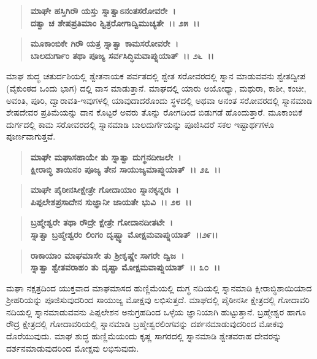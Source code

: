 \begin{verse}
\textbf{ಮಾಘೇ ಹಸ್ತಿಗಿ‌ರೌ ಯಸ್ತು ಸ್ನಾತ್ವಾಽನಂತಸರೋವರೇ~।}\\\textbf{ದತ್ವಾ ಚ ಶೇಷಪ್ರತಿಮಾಂ ಶ್ವಿತ್ರರೋಗಾದ್ವಿಮುಚ್ಯತೇ~।। ೨೫~।।}
\end{verse}

\begin{verse}
\textbf{ಮೂಕಾಂಬಿಕೇ ಗಿರೌ‌ ಯತ್ರ ಸ್ನಾತ್ವಾ ಕಾಮಸರೋವರೇ~।}\\\textbf{ಬಾಲದುರ್ಗಾಂ ತಥಾ ಪೂಜ್ಯ ಸರ್ವಸಿದ್ಧಿಮವಾಪ್ನುಯಾತ್~।। ೨೬~।।}
\end{verse}

ಮಾಘ ಶುದ್ಧ ಚತುರ್ದಶಿಯಲ್ಲಿ ಶ್ವೇತನಾಯಕ ಪರ್ವತದಲ್ಲಿ ಶ್ವೇತ ಸರೋವರದಲ್ಲಿ ಸ್ನಾನ ಮಾಡುವವನು ಶ್ವೇತದ್ವೀಪ (ವೈಕುಂಠದ ಒಂದು ಭಾಗ) ದಲ್ಲಿ ವಾಸ ಮಾಡುತ್ತಾನೆ. ಮಾಘದಲ್ಲಿ ಯಾರು ಅಯೋಧ್ಯಾ, ಮಥುರಾ, ಕಾಶೀ, ಕಂಚೀ, ಅವಂತಿ, ಪೂರಿ, ದ್ವಾರಾವತಿ-ಇವುಗಳಲ್ಲಿ ಯಾವುದಾದರೊಂದು ಸ್ಥಳದಲ್ಲಿ ಅಥವಾ ಅನಂತ ಸರೋವರದಲ್ಲಿ ಸ್ನಾನಮಾಡಿ ಶೇಷದೇವರ ಪ್ರತಿಮೆಯನ್ನು ದಾನ ಕೊಟ್ಟರೆ ಅವರು ತೊನ್ನು ರೋಗದಿಂದ ಬಿಡುಗಡೆ ಹೊಂದುತ್ತಾರೆ. ಮೂಕಾಂಬಿಕೆ ದುರ್ಗದಲ್ಲಿ ಕಾಮ ಸರೋವರದಲ್ಲಿ ಸ್ನಾನಮಾಡಿ ಬಾಲದುರ್ಗೆಯನ್ನು ಪೂಜಿಸಿದರೆ ಸಕಲ ಇಷ್ಟಾರ್ಥಗಳೂ ಪೂರ್ಣವಾಗುತ್ತವೆ.

\begin{verse}
\textbf{ಮಾಘೇ ಮಘಾಸಹಾಯೇ ತು ಸ್ನಾತ್ವಾ ದುಗ್ಧನದೀಜಲೇ~।}\\\textbf{ಕ್ಷೀರಾಬ್ಧಿ ಶಾಯಿನಂ ಪೂಜ್ಯ ತೇನ ಸಾಯುಜ್ಯಮಾಪ್ನುಯಾತ್~।। ೨೭~।।}
\end{verse}

\begin{verse}
\textbf{ಮಾಘೇ ಪೈಠೀನಸೀಕ್ಷೇತ್ರೇ ಗೋದಾಯಾಂ ಸ್ನಾನಕೃನ್ನರಃ~।}\\\textbf{ಪಿಪ್ಪಲೇಶಪ್ರಸಾದೇನ ಸುಜ್ಞಾನೀ ಜಾಯತೇ ಭುವಿ~।। ೨೮~।। }
\end{verse}

\begin{verse}
\textbf{ಬ್ರಹ್ಮೇಶ್ವರೇ ತಥಾ ರೌದ್ರೇ ಕ್ಷೇತ್ರೇ ಗೋದಾನದೀತಟೇ~।}\\\textbf{ಸ್ನಾತ್ವಾ ಬ್ರಹ್ಮೇಶ್ವರಂ ಲಿಂಗಂ ದೃಷ್ಟ್ವಾ ಮೋಕ್ಷಮವಾಪ್ನುಯಾತ್~।।೨೯।।} 
\end{verse}

\begin{verse}
\textbf{ರಾಕಾಯಾಂ ಮಾಘಮಾಸೇ ತು ಶ‍್ರೀಕೃಷ್ಣೇ ಸಾಗರೇ ದ್ವಿಜ~।}\\\textbf{ಸ್ನಾತ್ವಾ ಶ್ವೇತವರಾಹಂ ತು ದೃಷ್ಟಾ ಮೋಕ್ಷಮವಾಪ್ನುಯಾತ್~।। ೩೦~।।}
\end{verse}

ಮಘಾ ನಕ್ಷತ್ರದಿಂದ ಯುಕ್ತವಾದ ಮಾಘಮಾಸದ ಹುಣ್ಣಿಮೆಯಲ್ಲಿ ದುಗ್ಧ ನದಿಯಲ್ಲಿ ಸ್ನಾನಮಾಡಿ ಕ್ಷೀರಾಬ್ಧಿಶಾಯಿಯಾದ ಶ‍್ರೀಹರಿಯನ್ನು ಪೂಜಿಸುವುದರಿಂದ ಸಾಯುಜ್ಯ ಮೋಕ್ಷವು ಲಭಿಸುತ್ತದೆ. ಮಾಘದಲ್ಲಿ ಪೈಠೀನಸೀ ಕ್ಷೇತ್ರದಲ್ಲಿ ಗೋದಾವರಿ ನದಿಯಲ್ಲಿ ಸ್ನಾನಮಾಡುವವನು ಪಿಪ್ಪಲೇಶನ ಅನುಗ್ರಹದಿಂದ ಒಳ್ಳೆಯ ಜ್ಞಾನಿಯಾಗಿ ಹುಟ್ಟುತ್ತಾನೆ. ಬ್ರಹ್ಮೇಶ್ವರ ಹಾಗೂ ರೌದ್ರ ಕ್ಷೇತ್ರದಲ್ಲಿ ಗೋದಾವರಿಯಲ್ಲಿ ಸ್ನಾನಮಾಡಿ ಬ್ರಹ್ಮೇಶ್ವರಲಿಂಗವನ್ನು ದರ್ಶನಮಾಡುವುದರಿಂದ ಮೋಕವು ದೊರೆಯುವುದು. ಮಾಘ ಶುದ್ಧ ಹುಣ್ಣಿಮೆಯಂದು ಕೃಷ್ಣ ಸಾಗರದಲ್ಲಿ ಸ್ನಾನಮಾಡಿ ಶ್ವೇತವರಾಹ ದೇವರನ್ನು ದರ್ಶನಮಾಡುವುದರಿಂದ ಮೋಕ್ಷವು ಲಭಿಸುವುದು.

